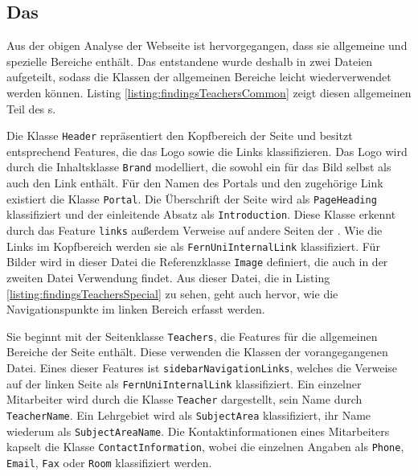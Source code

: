 \subsection{Das {\classificationModel}}
    Aus der obigen Analyse der Webseite ist hervorgegangen,
    dass sie allgemeine und spezielle Bereiche enthält.
    Das entstandene {\classificationModel} wurde deshalb in zwei Dateien aufgeteilt,
    sodass die Klassen der allgemeinen Bereiche leicht wiederverwendet werden können.
    Listing \ref{listing:findingsTeachersCommon} zeigt diesen allgemeinen
    Teil des {\classificationModel}s.

    

    Die Klasse \texttt{Header} repräsentiert den Kopfbereich der Seite
    und besitzt entsprechend Features,
    die das Logo sowie die Links klassifizieren.
    Das Logo wird durch die Inhaltsklasse \texttt{Brand} modelliert,
    die sowohl ein {} für das Bild selbst als auch den Link enthält.
    Für den Namen des Portals und den zugehörige Link existiert die Klasse \texttt{Portal}.
    Die Überschrift der Seite wird als \texttt{PageHeading} klassifiziert und
    der einleitende Absatz als \texttt{Introduction}.
    Diese Klasse erkennt durch das Feature \texttt{links} außerdem Verweise auf andere Seiten der {\fernUni}.
    Wie die Links im Kopfbereich werden sie als \texttt{FernUniInternalLink} klassifiziert.
    Für Bilder wird in dieser Datei die Referenzklasse \texttt{Image} definiert,
    die auch in der zweiten Datei Verwendung findet.
    Aus dieser Datei, die in Listing \ref{listing:findingsTeachersSpecial} zu sehen,
    geht auch hervor, wie die Navigationspunkte im linken Bereich erfasst werden.

    

    Sie beginnt mit der Seitenklasse \texttt{Teachers},
    die Features für die allgemeinen Bereiche der Seite enthält.
    Diese verwenden die Klassen der vorangegangenen Datei.
    Eines dieser Features ist \texttt{sidebarNavigationLinks},
    welches die Verweise auf der linken Seite als \texttt{FernUniInternalLink}
    klassifiziert.
    Ein einzelner Mitarbeiter wird durch die Klasse \texttt{Teacher} dargestellt,
    sein Name durch \texttt{TeacherName}.
    Ein Lehrgebiet wird als \texttt{SubjectArea} klassifiziert,
    ihr Name wiederum als \texttt{SubjectAreaName}.
    Die Kontaktinformationen eines Mitarbeiters kapselt die Klasse \texttt{ContactInformation},
    wobei die einzelnen Angaben als \texttt{Phone}, \texttt{Email}, \texttt{Fax} oder \texttt{Room}
    klassifiziert werden.


